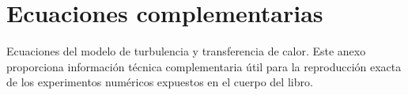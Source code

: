 \chapter{Ecuaciones complementarias}
\label{chap:anexoA}

Ecuaciones del modelo de turbulencia y transferencia de calor.
Este anexo proporciona información técnica complementaria útil para la reproducción exacta de los experimentos numéricos expuestos en el cuerpo del libro.
